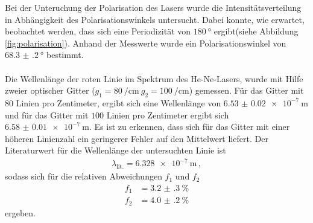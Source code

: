 Bei der Unteruchung der Polarisation des Lasers wurde die Intensitätsverteilung
in Abhängigkeit des Polarisationswinkels untersucht. Dabei konnte, wie erwartet,
beobachtet werden, dass sich eine Periodizität von $\SI{180}{\degree}$
ergibt(siehe Abbildung \ref{fig:polarisation}). Anhand der Messwerte
wurde ein Polarisationswinkel von $\SI{68.3(2)}{\degree}$ bestimmt.\\ \\


Die Wellenlänge der roten Linie im Spektrum des He-Ne-Lasers, wurde mit Hilfe
zweier optischer Gitter ($g_{1} = \SI{80}{\per\centi\meter} \ g_{2} = \SI{100}{\per\centi\meter}$)
gemessen. Für das Gitter mit $80$ Linien pro Zentimeter, ergibt sich eine Wellenlänge
von $\SI{6.53(2) e-7}{\meter}$ und für das Gitter mit $100$ Linien pro Zentimeter
ergibt sich $\SI{6.58(1) e-7}{\meter}$. Es ist zu erkennen, dass sich für das Gitter mit
einer höheren Linienzahl ein geringerer Fehler auf den Mittelwert liefert.
Der Literaturwert\cite{sample} für die Wellenlänge der untersuchten Linie ist
\begin{align*}
  \lambda_{\text{lit.}} = \SI{6.328 e-7}{\meter} \, ,
\end{align*}
sodass sich für die relativen Abweichungen $f_{1}$ und $f_{2}$
\begin{align*}
  f_{1} &= \SI{3.2(3)}{\percent}\\
  f_{2} &= \SI{4.0(2)}{\percent}
\end{align*}
ergeben.
